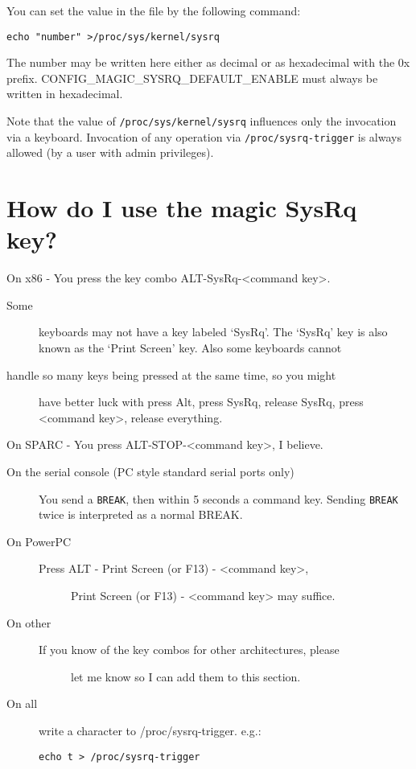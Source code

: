 \documentclass[article,letterpaper]{memoir}
\let\subsection\section
\let\section\chapter
\begin{document}
You can set the value in the file by the following command:

\begin{verbatim}
echo "number" >/proc/sys/kernel/sysrq
\end{verbatim}

The number may be written here either as decimal or as hexadecimal with
the 0x prefix. CONFIG\_MAGIC\_SYSRQ\_DEFAULT\_ENABLE must always be
written in hexadecimal.

Note that the value of \texttt{/proc/sys/kernel/sysrq} influences only
the invocation via a keyboard. Invocation of any operation via
\texttt{/proc/sysrq-trigger} is always allowed (by a user with admin
privileges).

\subsection{How do I use the magic SysRq
key?}\label{how-do-i-use-the-magic-sysrq-key}

On x86 - You press the key combo
ALT-SysRq-\textless{}command key\textgreater{}.

\begin{description}
\item[Some]
keyboards may not have a key labeled `SysRq'. The `SysRq' key is also
known as the `Print Screen' key. Also some keyboards cannot
\item[handle so many keys being pressed at the same time, so you might]
have better luck with press Alt, press SysRq, release SysRq, press
\textless{}command key\textgreater{}, release everything.
\end{description}

On SPARC - You press ALT-STOP-\textless{}command key\textgreater{}, I
believe.

\begin{description}
\item[On the serial console (PC style standard serial ports only)]
You send a \texttt{BREAK}, then within 5 seconds a command key. Sending
\texttt{BREAK} twice is interpreted as a normal BREAK.
\item[On PowerPC]
\begin{description}
\item[Press ALT - Print Screen (or F13) -
\textless{}command key\textgreater{},]
Print Screen (or F13) - \textless{}command key\textgreater{} may
suffice.
\end{description}
\item[On other]
\begin{description}
\item[If you know of the key combos for other architectures, please]
let me know so I can add them to this section.
\end{description}
\item[On all]
write a character to /proc/sysrq-trigger. e.g.:

\begin{verbatim}
echo t > /proc/sysrq-trigger
\end{verbatim}
\end{description}
\fi
\end{document}
